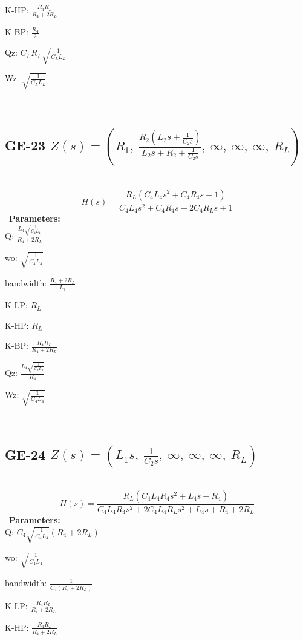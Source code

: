 \documentclass{article}
\begin{document}
K-HP: $\frac{R_{4} R_{L}}{R_{4} + 2 R_{L}}$\ 

K-BP: $\frac{R_{4}}{2}$\ 

Qz: $C_{L} R_{L} \sqrt{\frac{1}{C_{L} L_{L}}}$\ 

Wz: $\sqrt{\frac{1}{C_{L} L_{L}}}$\ 

\ 

\subsection{GE-23 $Z(s) = \left( R_{1}, \  \frac{R_{2} \left(L_{2} s + \frac{1}{C_{2} s}\right)}{L_{2} s + R_{2} + \frac{1}{C_{2} s}}, \  \infty, \  \infty, \  \infty, \  R_{L}\right)$ } \ 
\textbf{\[H(s) = \frac{R_{L} \left(C_{4} L_{4} s^{2} + C_{4} R_{4} s + 1\right)}{C_{4} L_{4} s^{2} + C_{4} R_{4} s + 2 C_{4} R_{L} s + 1}\] } \ 
\textbf{Parameters:}\\ 

Q: $\frac{L_{4} \sqrt{\frac{1}{C_{4} L_{4}}}}{R_{4} + 2 R_{L}}$\ 

wo: $\sqrt{\frac{1}{C_{4} L_{4}}}$\ 

bandwidth: $\frac{R_{4} + 2 R_{L}}{L_{4}}$\ 

K-LP: $R_{L}$\ 

K-HP: $R_{L}$\ 

K-BP: $\frac{R_{4} R_{L}}{R_{4} + 2 R_{L}}$\ 

Qz: $\frac{L_{4} \sqrt{\frac{1}{C_{4} L_{4}}}}{R_{4}}$\ 

Wz: $\sqrt{\frac{1}{C_{4} L_{4}}}$\ 

\ 

\subsection{GE-24 $Z(s) = \left( L_{1} s, \  \frac{1}{C_{2} s}, \  \infty, \  \infty, \  \infty, \  R_{L}\right)$ } \ 
\textbf{\[H(s) = \frac{R_{L} \left(C_{4} L_{4} R_{4} s^{2} + L_{4} s + R_{4}\right)}{C_{4} L_{4} R_{4} s^{2} + 2 C_{4} L_{4} R_{L} s^{2} + L_{4} s + R_{4} + 2 R_{L}}\] } \ 
\textbf{Parameters:}\\ 

Q: $C_{4} \sqrt{\frac{1}{C_{4} L_{4}}} \left(R_{4} + 2 R_{L}\right)$\ 

wo: $\sqrt{\frac{1}{C_{4} L_{4}}}$\ 

bandwidth: $\frac{1}{C_{4} \left(R_{4} + 2 R_{L}\right)}$\ 

K-LP: $\frac{R_{4} R_{L}}{R_{4} + 2 R_{L}}$\ 

K-HP: $\frac{R_{4} R_{L}}{R_{4} + 2 R_{L}}$\ 
\end{document}
